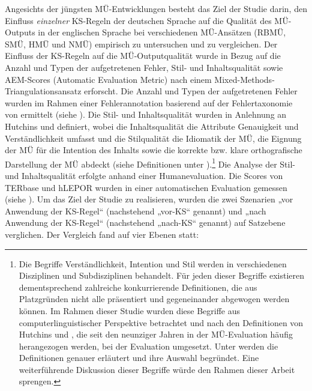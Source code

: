 Angesichts der jüngsten MÜ-Entwicklungen besteht das  Ziel der Studie darin, den Einfluss \textit{einzelner} KS-Regeln der deutschen Sprache auf die Qualität des MÜ-Outputs in der englischen Sprache bei verschiedenen MÜ-Ansätzen (RBMÜ, SMÜ, HMÜ und NMÜ) empirisch zu untersuchen und zu vergleichen. Der Einfluss der KS-Regeln auf die MÜ-Outputqualität wurde in Bezug auf die Anzahl und Typen der aufgetretenen Fehler, Stil- und Inhaltsqualität sowie AEM-Scores (Automatic Evaluation Metric) nach einem Mixed-Methods-Triangulationsansatz erforscht. Die Anzahl und Typen der aufgetretenen Fehler wurden im Rahmen einer Fehlerannotation basierend auf der Fehlertaxonomie von \citet{VilarEtAl2006} ermittelt (siehe ). Die Stil- und Inhaltsqualität wurden in Anlehnung an Hutchins und \citet[163]{Somers1992} definiert, wobei die Inhaltsqualität die Attribute Genauigkeit und Verständlichkeit umfasst und die Stilqualität die Idiomatik der MÜ, die Eignung der MÜ für die Intention des Inhalts sowie die korrekte bzw. klare orthografische Darstellung der MÜ abdeckt (siehe Definitionen unter ).\footnote{\textrm{Die Begriffe Verständlichkeit, Intention und Stil werden in verschiedenen Disziplinen und Subdisziplinen behandelt. Für jeden dieser Begriffe existieren dementsprechend zahlreiche konkurrierende Definitionen, die aus Platzgründen nicht alle präsentiert und gegeneinander abgewogen werden können. Im Rahmen dieser Studie wurden diese Begriffe aus computerlinguistischer Perspektive betrachtet und nach den Definitionen von Hutchins und \citet{Somers1992}, die seit den neunziger Jahren in der MÜ-Evaluation häufig herangezogen werden, bei der Evaluation umgesetzt. Unter  werden die Definitionen genauer erläutert und ihre Auswahl begründet. Eine weiterführende Diskussion dieser Begriffe würde den Rahmen dieser Arbeit sprengen.}} Die Analyse der Stil- und Inhaltsqualität erfolgte anhand einer Humanevaluation. Die Scores von TERbase \citep{SnoverEtAl2006} und hLEPOR \citep{HanEtAl2013} wurden in einer automatischen Evaluation gemessen (siehe ). Um das Ziel der Studie zu realisieren, wurden die zwei Szenarien „vor Anwendung der KS-Regel“ (nachstehend „vor-KS“ genannt) und „nach Anwendung der KS-Regel“ (nachstehend „nach-KS“ genannt) auf Satzebene verglichen. Der Vergleich fand auf vier Ebenen statt:

